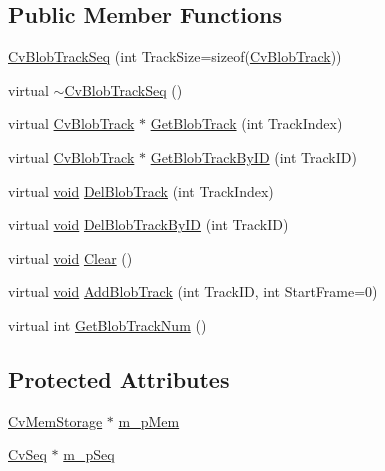 \subsection*{Public Member Functions}
\begin{DoxyCompactItemize}
\item 
\hyperlink{classCvBlobTrackSeq_ae0bae5e12b49568d98c414e14e4a95a9}{Cv\-Blob\-Track\-Seq} (int Track\-Size=sizeof(\hyperlink{structCvBlobTrack}{Cv\-Blob\-Track}))
\item 
virtual \hyperlink{classCvBlobTrackSeq_aaac7d16cda3786e5bbe2a28504bf4cfe}{$\sim$\-Cv\-Blob\-Track\-Seq} ()
\item 
virtual \hyperlink{structCvBlobTrack}{Cv\-Blob\-Track} $\ast$ \hyperlink{classCvBlobTrackSeq_a33a388060a59ac777bca6155559e23eb}{Get\-Blob\-Track} (int Track\-Index)
\item 
virtual \hyperlink{structCvBlobTrack}{Cv\-Blob\-Track} $\ast$ \hyperlink{classCvBlobTrackSeq_aa6f830778964d6aafaf79b37f63f2f3b}{Get\-Blob\-Track\-By\-I\-D} (int Track\-I\-D)
\item 
virtual \hyperlink{legacy_8hpp_a8bb47f092d473522721002c86c13b94e}{void} \hyperlink{classCvBlobTrackSeq_a9d2833254b2bce4c4e42568ba01d0ff6}{Del\-Blob\-Track} (int Track\-Index)
\item 
virtual \hyperlink{legacy_8hpp_a8bb47f092d473522721002c86c13b94e}{void} \hyperlink{classCvBlobTrackSeq_a286b753c687f368ae0d6461f960cbdc2}{Del\-Blob\-Track\-By\-I\-D} (int Track\-I\-D)
\item 
virtual \hyperlink{legacy_8hpp_a8bb47f092d473522721002c86c13b94e}{void} \hyperlink{classCvBlobTrackSeq_adcbeea9b41ae215fe743b36936356ac5}{Clear} ()
\item 
virtual \hyperlink{legacy_8hpp_a8bb47f092d473522721002c86c13b94e}{void} \hyperlink{classCvBlobTrackSeq_a272d2802d12872dec6fe7b76f10b04cc}{Add\-Blob\-Track} (int Track\-I\-D, int Start\-Frame=0)
\item 
virtual int \hyperlink{classCvBlobTrackSeq_aa53fe0690a5b3ecdd773c9c54b961352}{Get\-Blob\-Track\-Num} ()
\end{DoxyCompactItemize}
\subsection*{Protected Attributes}
\begin{DoxyCompactItemize}
\item 
\hyperlink{structCvMemStorage}{Cv\-Mem\-Storage} $\ast$ \hyperlink{classCvBlobTrackSeq_ac2af59cd26d4ff1bfb97fe465b3e6cab}{m\-\_\-p\-Mem}
\item 
\hyperlink{structCvSeq}{Cv\-Seq} $\ast$ \hyperlink{classCvBlobTrackSeq_a20db44731735887d26e16eff42d19259}{m\-\_\-p\-Seq}
\end{DoxyCompactItemize}


